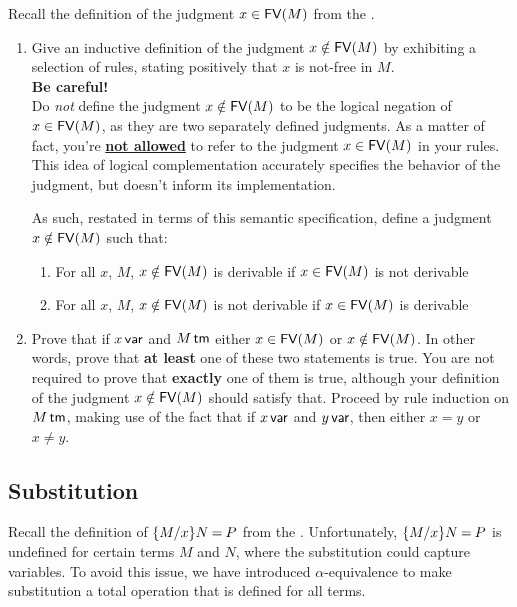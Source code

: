 \documentclass[11pt]{article}
\begin{document}
\begin{task}{20}
  Recall the definition of the judgment ${x}\in\mathsf{FV}(M)$ from the \Supplement.
  \begin{enumerate}
  \item
    Give an inductive definition of the judgment ${x}\notin\mathsf{FV}(M)$ by exhibiting a selection of rules, stating positively that $x$ is not-free in $M$. \\
    \textbf{Be careful!} \\
    Do \emph{not} define the judgment ${x}\notin\mathsf{FV}(M)$ to be the logical negation of ${x}\in\mathsf{FV}(M)$, as they are two separately defined judgments. As a matter of fact, you're \underline{\textbf{not allowed}} to refer to the judgment ${x}\in\mathsf{FV}(M)$ in your rules. This idea of logical complementation accurately specifies the behavior of the judgment, but doesn't inform its implementation.

    As such, restated in terms of this semantic specification, define a judgment ${x}\notin\mathsf{FV}(M)$ such that:
    \begin{enumerate}
    \item For all $x$, $M$, ${x}\notin\mathsf{FV}(M)$ is derivable if ${x}\in\mathsf{FV}(M)$ is not derivable
    \item For all $x$, $M$, ${x}\notin\mathsf{FV}(M)$ is not derivable if ${x}\in\mathsf{FV}(M)$ is derivable
    \end{enumerate}
    \item
      Prove that if ${x}\,\textsf{var}$ and ${M}\,\textsf{tm}$ either ${x}\in\mathsf{FV}(M)$ or ${x}\notin\mathsf{FV}(M)$.
      In other words, prove that \textbf{at least} one of these two statements is true.
      You are not required to prove that \textbf{exactly} one of them is true, although your definition of the judgment ${x}\notin\mathsf{FV}(M)$ should satisfy that.
      Proceed by rule induction on ${M}\,\textsf{tm}$, making use of the fact that if ${x}\,\textsf{var}$ and ${y}\,\textsf{var}$, then either $x = y$ or $x \ne y$.
  \end{enumerate}
\end{task}

\subsection{Substitution}

Recall the definition of $\{{M}\mathord{/}{x}\}{N}\mathbin{=}{P}$ from the \Supplement.
Unfortunately, $\{{M}\mathord{/}{x}\}{N}\mathbin{=}{P}$ is undefined for certain terms $M$ and $N$, where the substitution could capture variables.
To avoid this issue, we have introduced $\alpha$-equivalence to make substitution a total operation that is defined for all terms.
\end{document}
